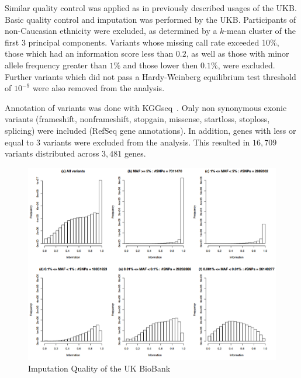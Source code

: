 Similar quality control was applied as in previously described usages of the UKB\@.
Basic quality control and imputation was performed by the UKB\@.
Participants of non-Caucasian ethnicity were excluded, as determined by a $k$-mean cluster of the first 3 principal components.
Variants whose missing call rate  exceeded 10\%, those which had an information score less than $0.2$, as well as those with minor allele frequency greater than $1\%$ and those lower then $0.1\%$, were excluded.
Further variants which did not pass a Hardy-Weinberg equilibrium test threshold of $10^{-9}$ were also removed from the analysis.

Annotation of variants was done with KGGseq~\cite{Li2012b}.
Only non synonymous exonic variants (frameshift, nonframeshift, stopgain, missense, startloss, stoploss, splicing) were included (RefSeq gene annotations).
In addition, genes with less or equal to $3$ variants were excluded from the analysis.
This resulted in $16,709$ variants distributed across $3,481$ genes.

\begin{figure}[htpb]
  \centering
  \includegraphics[width=0.8\linewidth]{ksburden/figures/imputation_qc.png}
  \caption[Imputation Quality]{Imputation Quality of the UK BioBank~\cite{Marchini2015}}\label{fig:imputation}
\end{figure}
